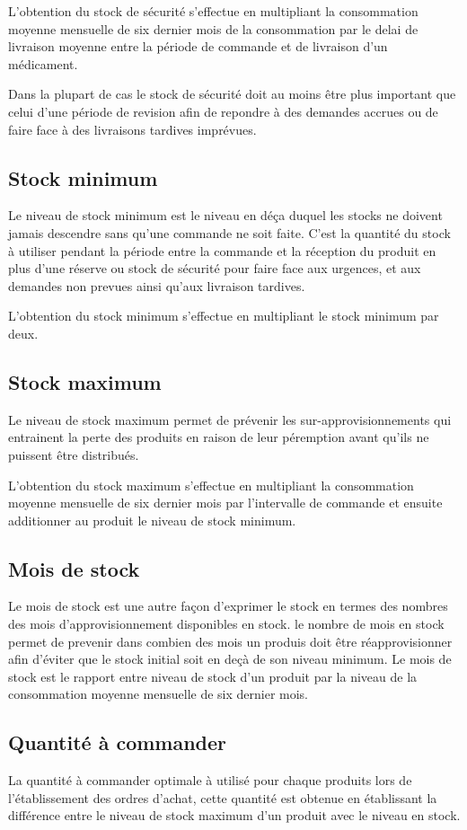 \documentclass[12pt,a4paper]{report}
\begin{document}
L'obtention du stock de sécurité s'effectue en multipliant la consommation moyenne mensuelle de six dernier mois de la consommation par le delai de livraison moyenne entre la période de commande et de livraison d'un médicament.

Dans la plupart de cas le stock de sécurité doit au moins être plus important que celui d'une période de revision afin de repondre à des demandes accrues ou de faire face à des livraisons tardives imprévues. 

\subsection{Stock minimum}
Le niveau de stock minimum est le niveau en déça duquel les stocks ne doivent jamais descendre sans qu'une commande ne soit faite. C'est la quantité du stock à utiliser pendant la période entre la commande et la réception du produit en plus d'une réserve ou stock de sécurité pour faire face aux urgences, et aux demandes non prevues ainsi qu'aux livraison tardives.

L'obtention du stock minimum s'effectue en multipliant le stock minimum par deux.

\subsection{Stock maximum}
Le niveau de stock maximum permet de prévenir les sur-approvisionnements qui entrainent la perte des produits en raison de leur péremption avant qu'ils ne puissent être distribués.

L'obtention du stock maximum s'effectue en multipliant la consommation moyenne mensuelle de six dernier mois par l'intervalle de commande et ensuite additionner au produit le niveau de stock minimum.

\subsection{Mois de stock}
Le mois de stock est une autre façon d'exprimer le stock en termes des nombres des mois d'approvisionnement disponibles en stock. le nombre de mois en stock permet de prevenir dans combien des mois un produis doit être réapprovisionner afin d'éviter que le stock initial soit en deçà de son niveau minimum.
Le mois de stock est le rapport entre niveau de stock d'un produit par la niveau de la consommation moyenne mensuelle de six dernier mois. 

\subsection{Quantité à commander}
La quantité à commander optimale à utilisé pour chaque produits lors de l'établissement des ordres d'achat, cette quantité est obtenue en établissant la différence entre le niveau de stock maximum d'un produit avec le niveau en stock.
\end{document}

